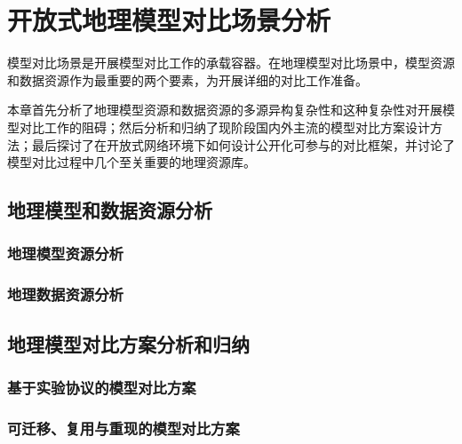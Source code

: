 \chapter{开放式地理模型对比场景分析}


模型对比场景是开展模型对比工作的承载容器。在地理模型对比场景中，模型资源和数据资源作为最重要的两个要素，为开展详细的对比工作准备。

本章首先分析了地理模型资源和数据资源的多源异构复杂性和这种复杂性对开展模型对比工作的阻碍；然后分析和归纳了现阶段国内外主流的模型对比方案设计方法；最后探讨了在开放式网络环境下如何设计公开化可参与的对比框架，并讨论了模型对比过程中几个至关重要的地理资源库。

\section{地理模型和数据资源分析}

\subsection{地理模型资源分析}

\subsection{地理数据资源分析}


\section{地理模型对比方案分析和归纳}
\subsection{基于实验协议的模型对比方案}

\subsection{可迁移、复用与重现的模型对比方案}

